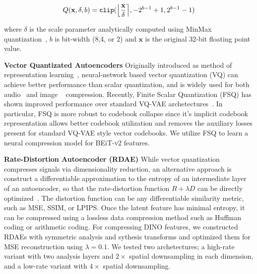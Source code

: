 \documentclass[10pt,twocolumn,letterpaper]{article}
\begin{document}
\begin{equation}
  Q(\textbf{x}, \delta, b) = \texttt{clip}(\Big{\lfloor} \frac{\textbf{x}}{\delta} \Big{\rceil}, -2^{b-1}+1, 2^{b-1}-1)
  \label{eq:quant}
\end{equation}

where $\delta$ is the scale parameter analytically computed using MinMax quantization~\cite{jacob2018quantization}, $b$ is bit-width (8,4, or 2) and $\textbf{x}$ is the original 32-bit floating point value.

\textbf{Vector Quantizated Autoencoders} Originally introduced as method of representation learning~\cite{van2017neural}, neural-network based vector quantization (VQ) can achieve better performance than scalar quantization, and is widely used for both audio~\cite{defossez2022high} and image ~\cite{Duan_2023, el-nouby2023image} compression. Recently, Finite Scalar Quantization (FSQ)  has shown improved performance over standard VQ-VAE archetectures~\cite{mentzer2023finite}. In particular, FSQ is more robust to codebook collapse since it's implicit codebook representation allows better codebook utilization and removes the auxiliary losses present for standard VQ-VAE style vector codebooks. We utilize FSQ to learn a neural compression model for BEiT-v2 features.

\textbf{Rate-Distortion Autoencoder (RDAE)} While vector quantization compresses signals via dimensionality reduction, an alternative approach is construct a differentiable approximation to the entropy of an intermediate layer of an autoencoder, so that the rate-distortion function $R+\lambda D$ can be directly optimized~\cite{balle2017end}. The distortion function can be any differentiable similarity metric, such as MSE, SSIM, or LPIPS.  Once the latent feature has minimal entropy, it can be compressed using a lossless data compression method such as Huffman coding or arithmetic coding. For compressing DINO features, we constructed RDAEs with symmetric analysis and sythesis transforms and optimized them for MSE reconstruction using $\lambda=0.1$. We tested two archetectures; a high-rate variant with two analysis layers and $2\times$ spatial downsampling in each dimension, and a low-rate variant with $4\times$ spatial downsampling.
\end{document}
